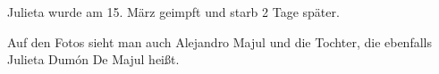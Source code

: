 Julieta wurde am 15. März geimpft und starb 2 Tage später.

Auf den Fotos sieht man auch Alejandro Majul und die Tochter, die ebenfalls
Julieta Dumón De Majul heißt.
